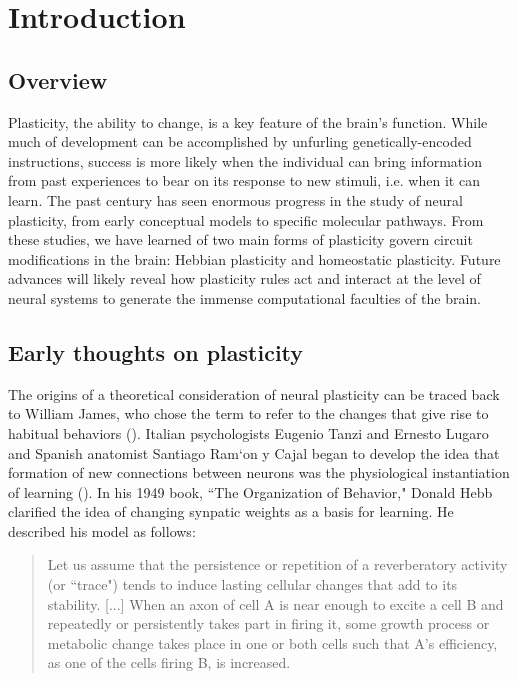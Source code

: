 \chapter{Introduction}

\section{Overview}

Plasticity, the ability to change, is a key feature of the brain's function. While much of development can be accomplished by  unfurling genetically-encoded instructions, success is more likely when the individual can bring information from past experiences to bear on its response to new stimuli, i.e. when it can learn. The past century has seen enormous progress in the study of neural plasticity, from early conceptual models to specific molecular pathways. From these studies, we have learned of two main forms of plasticity govern circuit modifications in the brain: Hebbian plasticity and homeostatic plasticity. Future advances will likely reveal how plasticity rules act and interact at the level of neural systems to generate the immense computational faculties of the brain.

\section{Early thoughts on plasticity}
The origins of a theoretical consideration of neural plasticity can be traced back to William James, who chose the term to refer to the changes that give rise to habitual behaviors (\cite{James1910, Berlucchi2009}). Italian psychologists Eugenio Tanzi and Ernesto Lugaro and Spanish anatomist Santiago Ram\a`on y Cajal began to develop the idea that formation of new connections between neurons was the physiological instantiation of learning (\cite{Berlucchi2009}). In his 1949 book, ``The Organization of Behavior," Donald Hebb clarified the idea of changing synpatic weights as a basis for learning. He described his model as follows:

\begin{quotation}
Let us assume that the persistence or repetition of a reverberatory activity (or ``trace") tends to induce lasting cellular changes that add to its stability. [...] When an axon of cell A is near enough to excite a cell B and repeatedly or persistently takes part in firing it, some growth process or metabolic change takes place in one or both cells such that A's efficiency, as one of the cells firing B, is increased.
\end{quotation}

